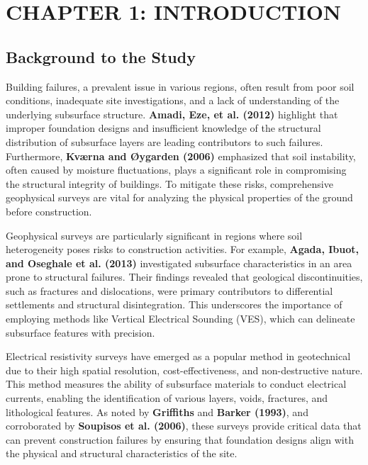 \documentclass[12pt,a4paper]{report}
\begin{document}
\listoffigures
{}


\tableofcontents

\newpage
{}

\chapter{CHAPTER 1: INTRODUCTION}

\section{Background to the Study}

Building failures, a prevalent issue in various regions, often result from poor soil conditions, inadequate site investigations, and a lack of understanding of the underlying subsurface structure. \textbf{Amadi, Eze, et al. (2012)} highlight that improper foundation designs and insufficient knowledge of the structural distribution of subsurface layers are leading contributors to such failures. Furthermore, \textbf{Kværna and Øygarden (2006)} emphasized that soil instability, often caused by moisture fluctuations, plays a significant role in compromising the structural integrity of buildings. To mitigate these risks, comprehensive geophysical surveys are vital for analyzing the physical properties of the ground before construction.

Geophysical surveys are particularly significant in regions where soil heterogeneity poses risks to construction activities. For example, \textbf{Agada, Ibuot, and Oseghale et al. (2013)} investigated subsurface characteristics in an area prone to structural failures. Their findings revealed that geological discontinuities, such as fractures and dislocations, were primary contributors to differential settlements and structural disintegration. This underscores the importance of employing methods like Vertical Electrical Sounding (VES), which can delineate subsurface features with precision.

Electrical resistivity surveys have emerged as a popular method in geotechnical due to their high spatial resolution, cost-effectiveness, and non-destructive nature. This method measures the ability of subsurface materials to conduct electrical currents, enabling the identification of various layers, voids, fractures, and lithological features. As noted by \textbf{Griffiths} and \textbf{Barker (1993)}, and corroborated by \textbf{Soupisos et al. (2006)}, these surveys provide critical data that can prevent construction failures by ensuring that foundation designs align with the physical and structural characteristics of the site. 
\end{document}
